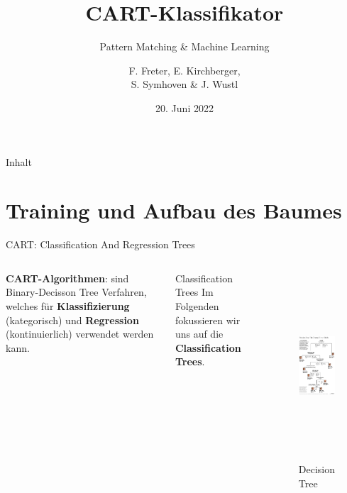 \documentclass{beamer}
\title{CART-Klassifikator}
\subtitle{Pattern Matching \& Machine Learning}
\author{F. Freter, E. Kirchberger,\\S. Symhoven \& J. Wustl}
\institute{Sommersemester 2023}
\date{20. Juni 2022}
\begin{document}

\begin{frame}
	\maketitle %
\end{frame}


\begin{frame}{Inhalt}
	\tableofcontents %
\end{frame}




\section{Training und Aufbau des Baumes}
 
\begin{frame}{CART: Classification And Regression Trees}
	\begin{columns}
			\textbf{CART-Algorithmen}: sind Binary-Decisson Tree Verfahren, welches für \textbf{Klassifizierung} (kategorisch) und \textbf{Regression} (kontinuierlich) verwendet werden kann.
			
			\begin{alertblock}{Classification Trees}
				Im Folgenden fokussieren wir uns auf die  \textbf{Classification Trees}.
			\end{alertblock}
			
			\begin{figure}
				\includegraphics[height=7cm]{Images/0416-nat-subOBAMA.jpg}
				\caption{Decision Tree \cite{hastie_tibshirani_friedman}}
			\end{figure}
	\end{columns}
		
	
\end{frame}
\end{document}
